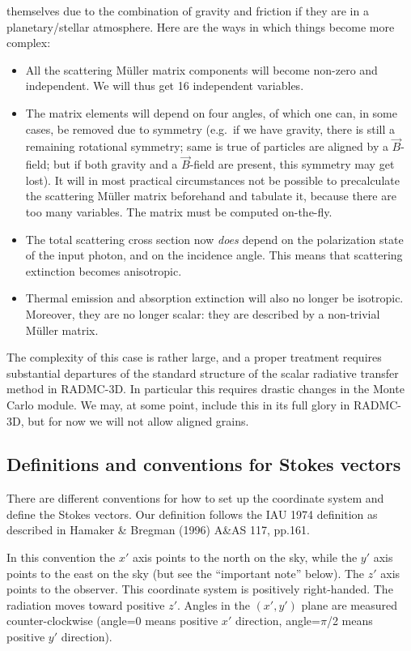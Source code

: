 \documentclass{report}
\begin{document}
\begin{enumerate}
  themselves due to the combination of gravity and friction if they are in a
  planetary/stellar atmosphere. Here are the ways in which things become
  more complex:
  \begin{itemize}
  \item All the scattering M\"uller matrix components will become
    non-zero and independent. We will thus get 16 independent variables.
  \item The matrix elements will depend on four angles, of which one can,
    in some cases, be removed due to symmetry (e.g.\ if we have gravity,
    there is still a remaining rotational symmetry; same is true of
    particles are aligned by a $\vec B$-field; but if both gravity and a
    $\vec B$-field are present, this symmetry may get lost). It will in
    most practical circumstances not be possible to precalculate the
    scattering M\"uller matrix beforehand and tabulate it, because there
    are too many variables. The matrix must be computed on-the-fly.
  \item The total scattering cross section now {\em does} depend on the
    polarization state of the input photon, and on the incidence angle.
    This means that scattering extinction becomes anisotropic.
  \item Thermal emission and absorption extinction will also no longer
    be isotropic. Moreover, they are no longer scalar: they are described
    by a non-trivial M\"uller matrix.
  \end{itemize}
  The complexity of this case is rather large, and a proper treatment
  requires substantial departures of the standard structure of the scalar
  radiative transfer method in RADMC-3D. In particular this requires 
  drastic changes in the Monte Carlo module. We may, at some point,
  include this in its full glory in RADMC-3D, but for now we will 
  not allow aligned grains.
\end{enumerate}
 
\subsection{Definitions and conventions for Stokes vectors}
\label{sec-definitions-stokes}
%
There are different conventions for how to set up the coordinate system
and define the Stokes vectors. Our definition follows the IAU 1974 
definition as described in Hamaker \& Bregman (1996) A\&AS 117, pp.161.

In this convention the $x'$ axis points to the north on the sky, while the
$y'$ axis points to the east on the sky (but see the ``important note''
below). The $z'$ axis points to the observer. This coordinate system is
positively right-handed. The radiation moves toward positive $z'$. Angles in
the $(x',y')$ plane are measured counter-clockwise (angle=0 means positive
$x'$ direction, angle=$\pi$/2 means positive $y'$ direction).
\end{document}
